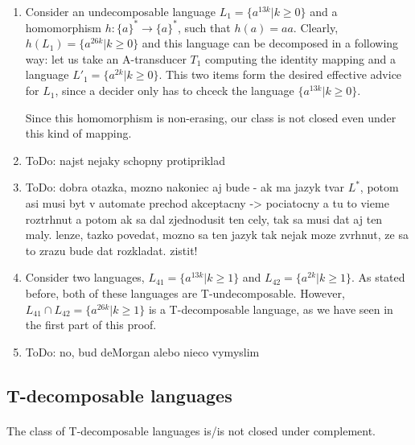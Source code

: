 \paragraph{}
\dokaz
\begin{enumerate}
\item Consider an undecomposable language $L_1 = \{ a^{13k} | k \geq 0 \}$ and a homomorphism $h: \{ a\}^* \to \{ a \}^*$, such that $h(a) = aa$. Clearly, $h(L_1) = \{ a^{26k} | k \geq 0 \}$ and this language can be decomposed in a following way: let us take an A-transducer $T_1$ computing the identity mapping and a language $L'_1 = \{ a^{2k} | k \geq 0 \}$. This two items form the desired effective advice for $L_1$, since a decider only has to chceck the language $\{ a^{13k} | k \geq 0 \}$.

Since this homomorphism is non-erasing, our class is not closed even under this kind of mapping.

\item \color{red}ToDo: najst nejaky schopny protipriklad\color{black}

\item \color{red}ToDo: dobra otazka, mozno nakoniec aj bude - ak ma jazyk  tvar $L^*$, potom asi musi byt v automate prechod akceptacny -> pociatocny a tu to vieme roztrhnut a potom ak sa dal zjednodusit ten cely, tak sa musi dat aj ten maly. lenze, tazko povedat, mozno sa ten jazyk tak nejak moze zvrhnut, ze sa to zrazu bude dat rozkladat. zistit!\color{black}

\item Consider two languages, $L_{41} = \{ a^{13k} | k \geq 1 \}$ and $L_{42} = \{ a^{2k} | k \geq 1 \}$. As stated before, both of these languages are T-undecomposable. However, $L_{41} \cap L_{42} = \{ a^{26k} | k \geq 1 \}$ is a T-decomposable language, as we have seen in the first part of this proof.

\item \color{red}ToDo: no, bud deMorgan alebo nieco vymyslim\color{black}
\end{enumerate}

\subsection{T-decomposable languages}
\paragraph{}
\cveta The class of T-decomposable languages is/is not closed under complement.


